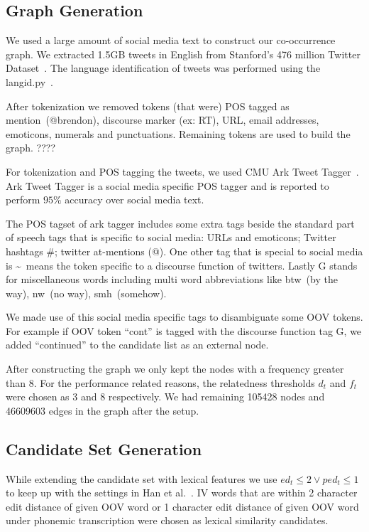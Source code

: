 \documentclass[preprint,review,12pt]{elsarticle}
\begin{document}
\subsection{Graph Generation}
We used a large amount of social media text to construct our co-occurrence graph. We extracted 1.5GB tweets in English from Stanford's 476 million Twitter Dataset~\cite{DBLP:conf/wsdm/YangL11}. The language identification of tweets was performed using the langid.py~\cite{Lui:2012:LOL:2390470.2390475, Baldwin:2010:LIL:1857999.1858026}.

After tokenization we removed tokens (that were) POS tagged as mention~(@brendon), discourse marker (ex: RT), URL, email addresses, emoticons, numerals and punctuations. Remaining tokens are used to build the graph. ????

For tokenization and POS tagging the tweets, we used CMU Ark Tweet Tagger~\cite{DBLP:conf/naacl/OwoputiODGSS13,Gimpel:2011:PTT:2002736.2002747}. Ark Tweet Tagger is a social media specific POS tagger and is reported to perform $95\%$ accuracy over social media text.

The POS tagset of ark tagger includes some extra tags beside the standard part of speech tags that is specific to social media: URLs and emoticons; Twitter hashtags \#; twitter at-mentions (@). One other tag that is special to social media is \textasciitilde~means the token specific to a discourse function of twitters. Lastly G stands for miscellaneous words including multi word abbreviations like btw~(by the way), nw~(no way), smh~(somehow).

We made use of this social media specific tags to disambiguate some OOV tokens. For example if OOV token ``cont'' is tagged with the discourse function tag G, we added ``continued'' to the candidate list as an external node.

After constructing the graph we only kept the nodes with a frequency greater than 8. For the performance related reasons, the relatedness thresholds $d_t$ and $f_t$  were chosen as 3 and 8 respectively. We had remaining 105428 nodes and 46609603 edges in the graph after the setup.

\subsection{Candidate Set Generation}

While extending the candidate set with lexical features we use ${ed_t \leq 2} \vee {ped_t \leq 1}$ to keep up with the settings in Han et al.~\cite{Han:2011:LNS:2002472.2002520}. IV words that are within 2 character edit distance of given OOV word or 1 character edit distance of given OOV word under phonemic transcription were chosen as lexical similarity candidates.
\end{document}
